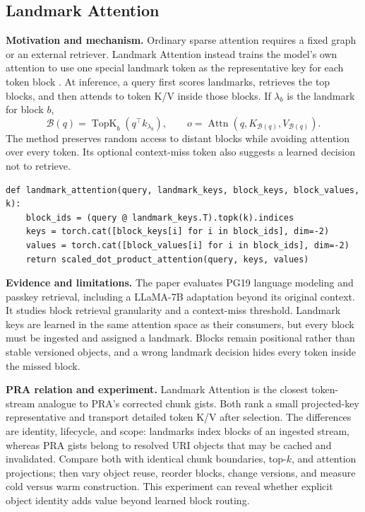 \subsection{Landmark Attention}

\textbf{Motivation and mechanism.} Ordinary sparse attention requires a fixed graph or an
external retriever. Landmark Attention instead trains the model's own attention to use one
special landmark token as the representative key for each token block
\citep{mohtashami2023landmark}. At inference, a query first scores landmarks, retrieves the
top blocks, and then attends to token K/V inside those blocks. If $\lambda_b$ is the
landmark for block $b$,
\begin{equation}
\mathcal B(q)=\operatorname{TopK}_b(q^\top k_{\lambda_b}),\qquad
o=\operatorname{Attn}(q,K_{\mathcal B(q)},V_{\mathcal B(q)}).
\end{equation}
The method preserves random access to distant blocks while avoiding attention over every
token. Its optional context-miss token also suggests a learned decision not to retrieve.

\begin{lstlisting}[caption={Landmark routing followed by block attention}]
def landmark_attention(query, landmark_keys, block_keys, block_values, k):
    block_ids = (query @ landmark_keys.T).topk(k).indices
    keys = torch.cat([block_keys[i] for i in block_ids], dim=-2)
    values = torch.cat([block_values[i] for i in block_ids], dim=-2)
    return scaled_dot_product_attention(query, keys, values)
\end{lstlisting}

\textbf{Evidence and limitations.} The paper evaluates PG19 language modeling and passkey
retrieval, including a LLaMA-7B adaptation beyond its original context. It studies block
retrieval granularity and a context-miss threshold. Landmark keys are learned in the same
attention space as their consumers, but every block must be ingested and assigned a
landmark. Blocks remain positional rather than stable versioned objects, and a wrong
landmark decision hides every token inside the missed block.

\textbf{PRA relation and experiment.} Landmark Attention is the closest token-stream
analogue to PRA's corrected chunk gists. Both rank a small projected-key representative and
transport detailed token K/V after selection. The differences are identity, lifecycle,
and scope: landmarks index blocks of an ingested stream, whereas PRA gists belong to
resolved URI objects that may be cached and invalidated. Compare both with identical chunk
boundaries, top-$k$, and attention projections; then vary object reuse, reorder blocks,
change versions, and measure cold versus warm construction. This experiment can reveal
whether explicit object identity adds value beyond learned block routing.

